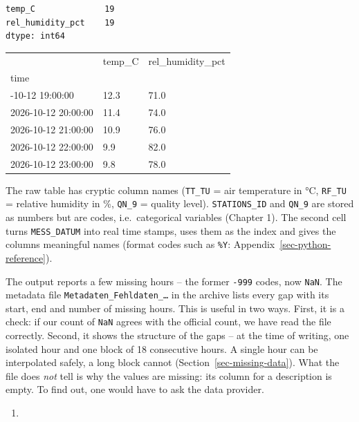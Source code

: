 \documentclass[
  letterpaper,
  DIV=11,
  numbers=noendperiod]{scrreprt}
\providecommand{\tightlist}{%
  \setlength{\itemsep}{0pt}\setlength{\parskip}{0pt}}\usepackage{longtable,booktabs,array}
\begin{document}
\begin{tcolorbox}
\begin{verbatim}
temp_C              19
rel_humidity_pct    19
dtype: int64
\end{verbatim}

\begin{longtable}[]{@{}lll@{}}
\toprule\noalign{}
& temp\_C & rel\_humidity\_pct \\
time & & \\
\midrule\noalign{}
\endhead
\bottomrule\noalign{}
\endlastfoot
2026-10-12 19:00:00 & 12.3 & 71.0 \\
2026-10-12 20:00:00 & 11.4 & 74.0 \\
2026-10-12 21:00:00 & 10.9 & 76.0 \\
2026-10-12 22:00:00 & 9.9 & 82.0 \\
2026-10-12 23:00:00 & 9.8 & 78.0 \\
\end{longtable}

The raw table has cryptic column names (\texttt{TT\_TU} = air
temperature in °C, \texttt{RF\_TU} = relative humidity in \%,
\texttt{QN\_9} = quality level). \texttt{STATIONS\_ID} and
\texttt{QN\_9} are stored as numbers but are codes, i.e.~categorical
variables (Chapter 1). The second cell turns \texttt{MESS\_DATUM} into
real time stamps, uses them as the index and gives the columns
meaningful names (format codes such as \texttt{\%Y}:
Appendix~\ref{sec-python-reference}).

The output reports a few missing hours -- the former \texttt{-999}
codes, now \texttt{NaN}. The metadata file
\texttt{Metadaten\_Fehldaten\_…} in the archive lists every gap with its
start, end and number of missing hours. This is useful in two ways.
First, it is a check: if our count of \texttt{NaN} agrees with the
official count, we have read the file correctly. Second, it shows the
structure of the gaps -- at the time of writing, one isolated hour and
one block of 18 consecutive hours. A single hour can be interpolated
safely, a long block cannot (Section~\ref{sec-missing-data}). What the
file does \emph{not} tell is why the values are missing: its column for
a description is empty. To find out, one would have to ask the data
provider.

\begin{enumerate}
\def\labelenumi{(\alph{enumi})}
\setcounter{enumi}{1}
\tightlist
\item
\end{enumerate}


\end{tcolorbox}
\end{document}
